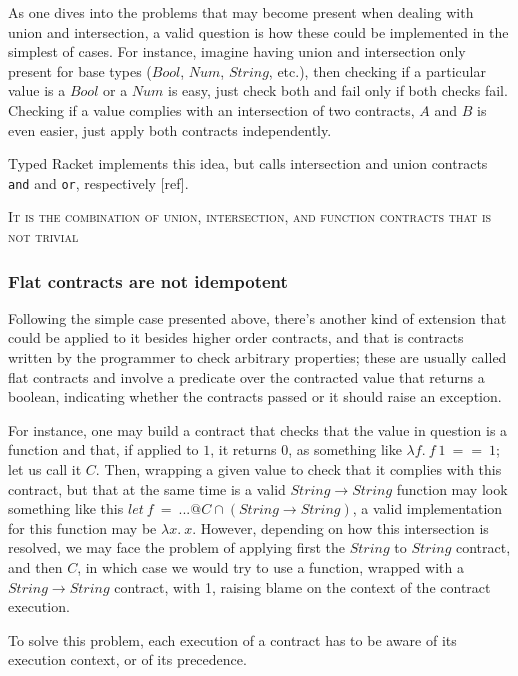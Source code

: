 As one dives into the problems that may become present when dealing with union and intersection,
a valid question is how these could be implemented in the simplest of cases.
For instance, imagine having
union and intersection only present for base types ($Bool$, $Num$, $String$, etc.), then checking
if a particular value is a $Bool$ or a $Num$ is easy, just check both and fail only if both 
checks fail.
Checking if a value complies with an intersection of two contracts, $A$ and $B$ is even
easier, just apply both contracts independently.

Typed Racket implements this idea, but calls intersection and union contracts
\texttt{and} and \texttt{or}, respectively [ref].

\textsc{It is the combination of union, intersection, and function contracts that is not trivial}

\subsubsection*{Flat contracts are not idempotent}

Following the simple case presented above, there's another kind of extension that could be
applied to it besides higher order contracts, and that is contracts written by the
programmer to check arbitrary properties; these are usually called flat contracts and
involve a predicate over the contracted value that returns a boolean, indicating whether
the contracts passed or it should raise an exception.

For instance, one may build a contract that checks that the value in question is a
function and that, if applied to $1$, it returns $0$, as something like
$\lambda f.~f~1~==~1$; let us call it $C$.
Then, wrapping a given value to check that it complies with this contract, but that at
the same time is a valid $String \rightarrow String$ function may look something like this
$let~f~=~...@C \cap (String \rightarrow String)$, a valid implementation for this function
may be $\lambda x.~x$.
However, depending on how this intersection is resolved, we may face the problem of applying first
the $String$ to $String$ contract, and then $C$, in which case we would try to use a function,
wrapped with a $String \rightarrow String$ contract, with 1, raising blame on the context
of the contract execution.

To solve this problem, each execution of a contract has to be aware of its execution context,
or of its precedence.



